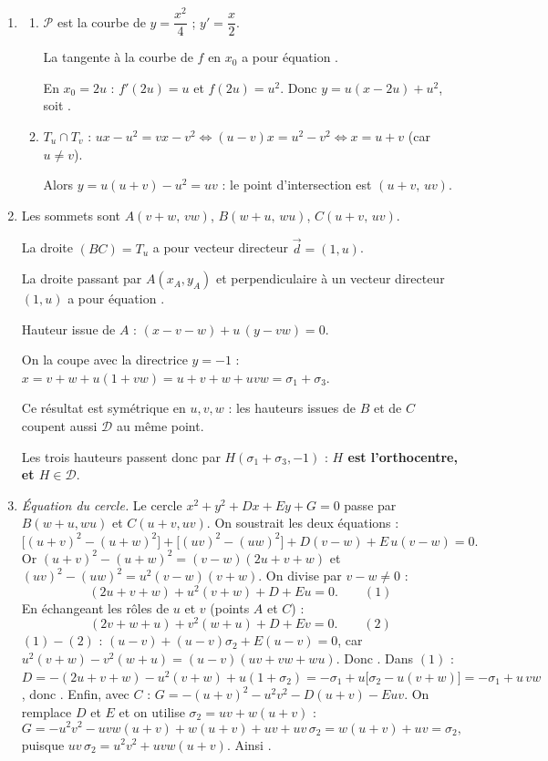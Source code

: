 \begin{enumerate}[itemsep=14pt]
  \item\leavevmode
  \begin{enumerate}[itemsep=8pt]
    \item $\mathcal P$ est la courbe de $y=\dfrac{x^2}4$ ; $y'=\dfrac x2$.

    \begin{prop}[Tangente]
    La tangente à la courbe de $f$ en $x_0$ a pour équation .
    \end{prop}
    En $x_0=2u$ : $f'(2u)=u$ et $f(2u)=u^2$. Donc $y=u(x-2u)+u^2$, soit .
    \item $T_u\cap T_v$ : $ux-u^2=vx-v^2\iff(u-v)x=u^2-v^2\iff x=u+v$ (car $u\neq v$).

    Alors $y=u(u+v)-u^2=uv$ : le point d'intersection est $(u+v,\,uv)$.
  \end{enumerate}

  \item Les sommets sont $A(v+w,\,vw)$, $B(w+u,\,wu)$, $C(u+v,\,uv)$.

  La droite $(BC)=T_u$ a pour vecteur directeur $\vec d=(1,u)$.

  \begin{prop}
  La droite passant par $A(x_A,y_A)$ et perpendiculaire à un vecteur directeur $(1,u)$ a pour équation .
  \end{prop}
  Hauteur issue de $A$ : $(x-v-w)+u\,(y-vw)=0$.

  On la coupe avec la directrice $y=-1$ : $x=v+w+u(1+vw)=u+v+w+uvw=\sigma_1+\sigma_3$.

  Ce résultat est symétrique en $u,v,w$ : les hauteurs issues de $B$ et de $C$ coupent aussi $\mathcal D$ au même point.

  Les trois hauteurs passent donc par $H(\sigma_1+\sigma_3,-1)$ : \textbf{$H$ est l'orthocentre, et $H\in\mathcal D$}.

  \item \emph{Équation du cercle.} Le cercle $x^2+y^2+Dx+Ey+G=0$ passe par $B(w+u,wu)$ et $C(u+v,uv)$. On soustrait les deux équations :
  \[\big[(u+v)^2-(u+w)^2\big]+\big[(uv)^2-(uw)^2\big]+D(v-w)+E\,u(v-w)=0.\]
  Or $(u+v)^2-(u+w)^2=(v-w)(2u+v+w)$ et $(uv)^2-(uw)^2=u^2(v-w)(v+w)$. On divise par $v-w\neq0$ :
  \[(2u+v+w)+u^2(v+w)+D+Eu=0.\qquad(1)\]
  En échangeant les rôles de $u$ et $v$ (points $A$ et $C$) :
  \[(2v+w+u)+v^2(w+u)+D+Ev=0.\qquad(2)\]
  $(1)-(2)$ : $(u-v)+(u-v)\sigma_2+E(u-v)=0$, car $u^2(v+w)-v^2(w+u)=(u-v)(uv+vw+wu)$. Donc .
  Dans $(1)$ : $D=-(2u+v+w)-u^2(v+w)+u(1+\sigma_2)=-\sigma_1+u\big[\sigma_2-u(v+w)\big]=-\sigma_1+u\,vw$, donc .
  Enfin, avec $C$ : $G=-(u+v)^2-u^2v^2-D(u+v)-Euv$. On remplace $D$ et $E$ et on utilise $\sigma_2=uv+w(u+v)$ :
  \[G=-u^2v^2-uvw(u+v)+w(u+v)+uv+uv\,\sigma_2=w(u+v)+uv=\sigma_2,\]
  puisque $uv\,\sigma_2=u^2v^2+uvw(u+v)$. Ainsi .


\end{enumerate}
